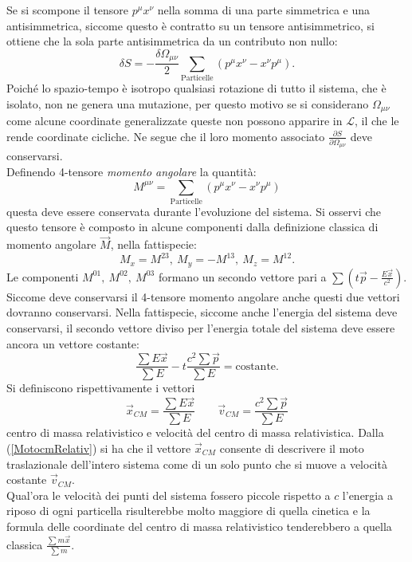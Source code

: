 Se si scompone il tensore $p^\mu x^\nu$ nella somma di una parte simmetrica e una antisimmetrica, siccome questo è contratto su un tensore antisimmetrico, si ottiene che la sola parte antisimmetrica da un contributo non nullo: 
\begin{equation*}
    \delta S=-\frac{\delta \Omega_{\mu \nu}}{2}\sum_{\text{Particelle}}(p^\mu x^\nu-x^\nu p^\mu).
\end{equation*}
Poiché lo spazio-tempo è isotropo qualsiasi rotazione di tutto il sistema, che è isolato, non ne genera una mutazione, per questo motivo se si considerano $\Omega_{\mu\nu}$ come alcune coordinate generalizzate queste non possono apparire in $\mathcal{L} $, il che le rende coordinate cicliche. Ne segue che il loro momento associato $\frac{\partial S}{\partial\Omega_{\mu \nu}}$ deve conservarsi.\\Definendo 4-tensore \emph{momento angolare} la quantità:
\begin{equation}
    M^{\mu\nu}=\sum_{\text{Particelle}}(p^\mu x^\nu-x^\nu p^\mu )
\end{equation}
questa deve essere conservata durante l'evoluzione del sistema. Si osservi che questo tensore è composto in alcune componenti dalla definizione classica di momento angolare $\vec{M}$, nella fattispecie:
\begin{equation*}
    M_x=M^{23},\ M_y=-M^{13},\ M_z=M^{12}.
\end{equation*}
Le componenti $M^{01},\ M^{02},\ M^{03}$ formano un secondo vettore pari a $\sum(t\vec{p}-\frac{E\vec{x}}{c^2})$. Siccome deve conservarsi il 4-tensore momento angolare anche questi due vettori dovranno conservarsi. Nella fattispecie, siccome anche l'energia del sistema deve conservarsi, il secondo vettore diviso per l'energia totale del sistema deve essere ancora un vettore costante:
\begin{equation}
    \frac{\sum E \vec{x}}{\sum E}- t\frac{c^2\sum\vec{p}}{\sum E}=\text{costante}.\label{MotocmRelativ}
\end{equation}
Si definiscono rispettivamente i vettori
\begin{equation}
    \vec x_{CM}=\frac{\sum E \vec{x}}{\sum E} \qquad \vec v_{CM}=\frac{c^2\sum\vec{p}}{\sum E}\label{cmRelativ}
\end{equation}
centro di massa relativistico e velocità del centro di massa relativistica. Dalla (\ref{MotocmRelativ}) si ha che il vettore $\vec x_{CM}$ consente di descrivere il moto traslazionale dell'intero sistema come di un solo punto che si muove a velocità  costante $\vec v_{CM}$.\\
 Qual'ora le velocità dei punti del sistema fossero piccole rispetto a $c$ l'energia a riposo di ogni particella risulterebbe molto maggiore di quella cinetica e la formula delle coordinate del centro di massa relativistico tenderebbero a quella classica $\frac{\sum m\vec{x}}{\sum m}$. 
